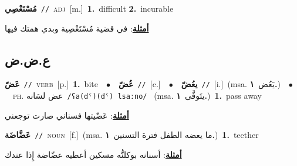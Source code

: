 \documentclass[10pt,a4paper,twoside]{article} %
\begin{document}
\begin{multicols}{2}
{\setlength\topsep{0pt}\textbf{\foreignlanguage{arabic}{مُسْتَعْصِي}}\ {\color{gray}\texttt{//}\color{black}}\ \textsc{adj}\ [m.]\ \textbf{1.}~difficult  \textbf{2.}~incurable\  \begin{flushright}\color{gray}\foreignlanguage{arabic}{\textbf{\underline{\foreignlanguage{arabic}{أمثلة}}}: في قضية مُسْتَعْصِية وبدي همتك فيها}\end{flushright}\color{black}} \vspace{2mm}

\vspace{-3mm}
\subsection*{\color{blue}\foreignlanguage{arabic}{ع.ض.ض}\color{blue}{}} 

{\setlength\topsep{0pt}\textbf{\foreignlanguage{arabic}{عَضّ}}\ {\color{gray}\texttt{//}\color{black}}\ \textsc{verb}\ [p.]\ \textbf{1.}~bite\ \ $\bullet$\ \ \setlength\topsep{0pt}\textbf{\foreignlanguage{arabic}{عُضّ}}\ {\color{gray}\texttt{//}\color{black}}\ [c.]\ \ $\bullet$\ \ \setlength\topsep{0pt}\textbf{\foreignlanguage{arabic}{يعُضّ}}\ {\color{gray}\texttt{//}\color{black}}\ [i.]\ \color{gray}(msa. \foreignlanguage{arabic}{يَعُض}~\foreignlanguage{arabic}{\textbf{١.}})\color{black}\ \ $\bullet$\ \ \textsc{ph.} \color{gray} \foreignlanguage{arabic}{عض لسَانه}\color{black}\ {\color{gray}\texttt{/{\sffamily ʕa(dˤ)(dˤ) lsaːno}/}\color{black}}\ \color{gray} (msa. \foreignlanguage{arabic}{يتَوفَّى}~\foreignlanguage{arabic}{\textbf{١.}})\color{black}\ \textbf{1.}~pass away\  \begin{flushright}\color{gray}\foreignlanguage{arabic}{\textbf{\underline{\foreignlanguage{arabic}{أمثلة}}}: عَضّيتها فسناني صارت توجعني}\end{flushright}\color{black}} \vspace{2mm}

{\setlength\topsep{0pt}\textbf{\foreignlanguage{arabic}{عَضَّاضَة}}\ {\color{gray}\texttt{//}\color{black}}\ \textsc{noun}\ [f.]\ \color{gray}(msa. \foreignlanguage{arabic}{ما يعضه الطفل فترة التسنين}~\foreignlanguage{arabic}{\textbf{١.}})\color{black}\ \textbf{1.}~teether\  \begin{flushright}\color{gray}\foreignlanguage{arabic}{\textbf{\underline{\foreignlanguage{arabic}{أمثلة}}}: أسنانه بوكلنُّه مسكين أعطيه عضّاضة إِذا عندك}\end{flushright}\color{black}} \vspace{2mm}


\end{multicols}
\end{document}
